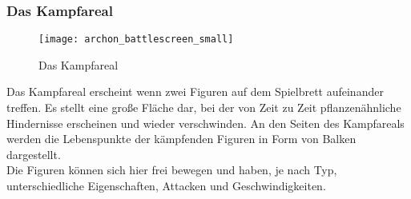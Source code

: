 \subsubsection{Das Kampfareal}
\begin{figure}[htp]
	\centering
	\captionsetup{justification=centering}
	\texttt{[image: archon\_battlescreen\_small]}
	\caption[Kampfareal]{Das Kampfareal}
	\label{fig:Battlescreen}
\end{figure}
\noindent Das Kampfareal erscheint wenn zwei Figuren auf dem Spielbrett aufeinander treffen. Es stellt eine große Fläche dar, bei der von Zeit zu Zeit pflanzenähnliche Hindernisse erscheinen und wieder verschwinden. An den Seiten des Kampfareals werden die Lebenspunkte der kämpfenden Figuren in Form von Balken dargestellt.\\
Die Figuren können sich hier frei bewegen und haben, je nach Typ, unterschiedliche Eigenschaften, Attacken und Geschwindigkeiten.

